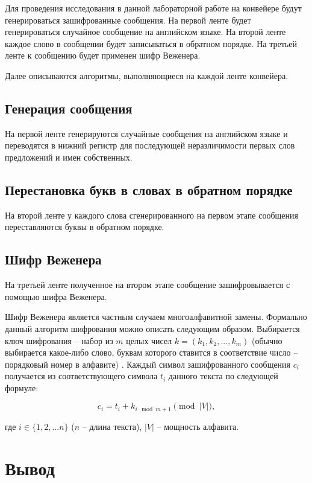 Для проведения исследования в данной лабораторной работе на конвейере будут
генерироваться зашифрованные сообщения. На первой ленте будет генерироваться
случайное сообщение на английском языке. На второй ленте каждое слово в
сообщении будет записываться в обратном порядке. На третьей ленте к сообщению
будет применен шифр Веженера.

Далее описываются алгоритмы, выполняющиеся на каждой ленте конвейера.

\subsection{Генерация сообщения}

На первой ленте генерируются случайные сообщения на английском языке и
переводятся в нижний регистр для последующей неразличимости первых слов
предложений и имен собственных.

\subsection{Перестановка букв в словах в обратном порядке}

На второй ленте у каждого слова сгенерированного на первом этапе сообщения
переставляются буквы в обратном порядке.

\subsection{Шифр Веженера}

На третьей ленте полученное на втором этапе сообщение зашифровывается с
помощью шифра Веженера.

Шифр Веженера является частным случаем многоалфавитной замены. Формально
данный алгоритм шифрования можно описать следующим образом. Выбирается ключ
шифрования -- набор из $m$ целых чисел $k = (k_1, k_2, ..., k_m)$ (обычно
выбирается какое-либо слово, буквам которого ставится в соответствие число --
порядковый номер в алфавите) \cite{Vegenere}. Каждый символ зашифрованного
сообщения $c_i$ получается из соответствующего символа $t_i$ данного текста по
следующей формуле:

\begin{equation}
    c_i = t_i + k_{i \mod m + 1} \pmod {|V|},
\end{equation}

где $i \in \{1, 2, ... n\}$ ($n$ -- длина текста), $|V|$ -- мощность алфавита.

\section{Вывод}

